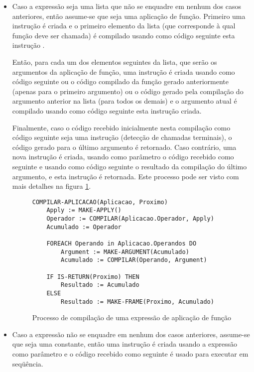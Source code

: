\begin{itemize}
\item Caso a expressão seja uma lista que não se enquadre em nenhum dos casos
anteriores, então assume-se que seja uma aplicação de função. Primeiro uma
instrução  é criada e o primeiro elemento da lista (que corresponde
à qual função deve ser chamada) é compilado usando como código seguinte esta
instrução . 

Então, para cada um dos elementos seguintes da lista, que serão os argumentos
da aplicação de função, uma instrução   é criada usando como
código seguinte ou o código compilado da função gerado anteriormente 
(apenas para o primeiro argumento) ou o código gerado pela compilação do
argumento anterior na lista (para todos os demais) e o argumento atual é
compilado usando como código seguinte esta instrução  criada.

Finalmente, caso o código recebido inicialmente nesta compilação como código
seguinte seja uma instrução  (detecção de chamadas terminais),
o código gerado para o último argumento é retornado. Caso contrário, uma nova
instrução  é criada, usando como parâmetro o código recebido como
seguinte e usando como código seguinte o resultado da compilação do último 
argumento, e esta instrução  é retornada. Este processo pode ser
visto com mais detalhes na figura \ref{fig:compile-application}.

\begin{figure}
\begin{lstlisting}
COMPILAR-APLICACAO(Aplicacao, Proximo)
    Apply := MAKE-APPLY()
    Operador := COMPILAR(Aplicacao.Operador, Apply)
    Acumulado := Operador
    
    FOREACH Operando in Aplicacao.Operandos DO
        Argument := MAKE-ARGUMENT(Acumulado)
        Acumulado := COMPILAR(Operando, Argument)
    
    IF IS-RETURN(Proximo) THEN
        Resultado := Acumulado
    ELSE
        Resultado := MAKE-FRAME(Proximo, Acumulado)
\end{lstlisting}
\caption{Processo de compilação de uma expressão de aplicação de função}
\label{fig:compile-application}
\end{figure}
\item Caso a expressão não se enquadre em nenhum dos casos anteriores, 
assume-se que seja uma constante, então uma instrução  é criada
usando a expressão como parâmetro e o código recebido como seguinte é usado 
para executar em seqüência.

\end{itemize}


